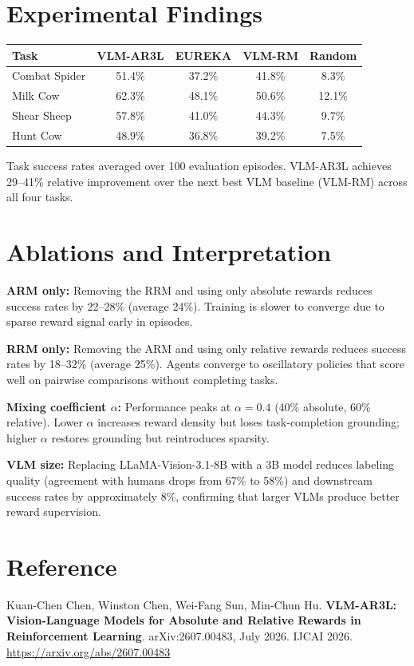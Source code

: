 \documentclass[10pt,twocolumn]{article}
\begin{document}
\section{Experimental Findings}

\begin{center}
\small
\begin{tabular}{lcccc}
\toprule
\textbf{Task} & \textbf{VLM-AR3L} & \textbf{EUREKA} & \textbf{VLM-RM} & \textbf{Random} \\
\midrule
Combat Spider  & 51.4\% & 37.2\% & 41.8\% & 8.3\% \\
Milk Cow       & 62.3\% & 48.1\% & 50.6\% & 12.1\% \\
Shear Sheep    & 57.8\% & 41.0\% & 44.3\% & 9.7\% \\
Hunt Cow       & 48.9\% & 36.8\% & 39.2\% & 7.5\% \\
\bottomrule
\end{tabular}
\end{center}

Task success rates averaged over 100 evaluation episodes.
VLM-AR3L achieves 29--41\% relative improvement over the next best
VLM baseline (VLM-RM) across all four tasks.

\section{Ablations and Interpretation}

\textbf{ARM only:} Removing the RRM and using only absolute rewards
reduces success rates by 22--28\% (average 24\%). Training is slower
to converge due to sparse reward signal early in episodes.

\textbf{RRM only:} Removing the ARM and using only relative rewards
reduces success rates by 18--32\% (average 25\%). Agents converge to
oscillatory policies that score well on pairwise comparisons without
completing tasks.

\textbf{Mixing coefficient $\alpha$:} Performance peaks at $\alpha = 0.4$
(40\% absolute, 60\% relative). Lower $\alpha$ increases reward density
but loses task-completion grounding; higher $\alpha$ restores grounding
but reintroduces sparsity.

\textbf{VLM size:} Replacing LLaMA-Vision-3.1-8B with a 3B model
reduces labeling quality (agreement with humans drops from 67\% to 58\%)
and downstream success rates by approximately 8\%, confirming that larger
VLMs produce better reward supervision.

\section*{Reference}

Kuan-Chen Chen, Winston Chen, Wei-Fang Sun, Min-Chun Hu.
\textbf{VLM-AR3L: Vision-Language Models for Absolute and Relative Rewards
in Reinforcement Learning}.
arXiv:2607.00483, July 2026. IJCAI 2026.
\url{https://arxiv.org/abs/2607.00483}
\end{document}
